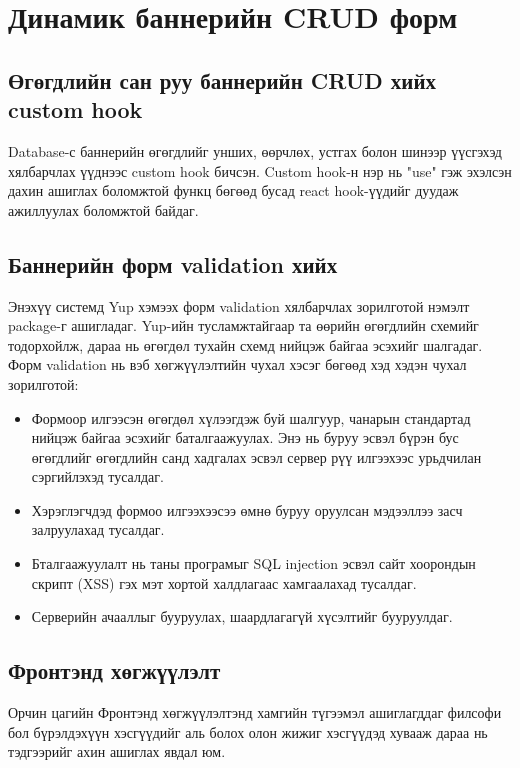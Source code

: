 \section{Динамик баннерийн CRUD форм}
\subsection{Өгөгдлийн сан руу баннерийн CRUD хийх custom hook}
Database-с баннерийн өгөгдлийг унших, өөрчлөх, устгах болон шинээр үүсгэхэд хялбарчлах үүднээс custom hook бичсэн. Custom hook-н нэр нь "use" гэж эхэлсэн дахин ашиглах боломжтой функц бөгөөд бусад react hook-үүдийг дуудаж ажиллуулах боломжтой байдаг.



\subsection{Баннерийн форм validation хийх}
Энэхүү системд Yup хэмээх форм validation хялбарчлах зорилготой нэмэлт package-г ашигладаг. Yup-ийн тусламжтайгаар та өөрийн өгөгдлийн схемийг тодорхойлж, дараа нь өгөгдөл тухайн схемд нийцэж байгаа эсэхийг шалгадаг.
Форм validation нь вэб хөгжүүлэлтийн чухал хэсэг бөгөөд хэд хэдэн чухал зорилготой:
\begin{itemize}
   \item Формоор илгээсэн өгөгдөл хүлээгдэж буй шалгуур, чанарын стандартад нийцэж байгаа эсэхийг баталгаажуулах. Энэ нь буруу эсвэл бүрэн бус өгөгдлийг өгөгдлийн санд хадгалах эсвэл сервер рүү илгээхээс урьдчилан сэргийлэхэд тусалдаг.

   \item Хэрэглэгчдэд формоо илгээхээсээ өмнө буруу оруулсан мэдээллээ засч залруулахад тусалдаг.

   \item Бталгаажуулалт нь таны програмыг SQL injection эсвэл сайт хоорондын скрипт (XSS) гэх мэт хортой халдлагаас хамгаалахад тусалдаг.

   \item Серверийн ачааллыг бууруулах, шаардлагагүй хүсэлтийг бууруулдаг.
\end{itemize}


\subsection{Фронтэнд хөгжүүлэлт}
Орчин цагийн Фронтэнд хөгжүүлэлтэнд хамгийн түгээмэл ашиглагддаг филсофи бол бүрэлдэхүүн хэсгүүдийг аль болох олон жижиг хэсгүүдэд хувааж дараа нь тэдгээрийг ахин ашиглах явдал юм.

